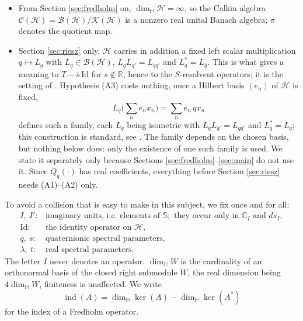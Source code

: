 \documentclass[12pt,a4paper]{article}
\theoremstyle{plain}
\theoremstyle{definition}
\theoremstyle{remark}
\newcommand{\HH}{\mathbb H}
\newcommand{\RR}{\mathbb R}
\newcommand{\CC}{\mathbb C}
\newcommand{\BB}{\mathcal B}
\newcommand{\KK}{\mathcal K}
\newcommand{\Calk}{\mathcal C}
\newcommand{\Id}{\mathrm{Id}}
\newcommand{\HS}{\mathcal H}
\newcommand{\sphere}{\mathbb S}
\newcommand{\dimH}{\dim_{\HH}}
\DeclareMathOperator{\ind}{ind}
\begin{document}
{\begin{itemize}[leftmargin=3em]
\item[(A2)] From Section \ref{sec:fredholm} on, $\dimH\HS=\infty$, so
the Calkin algebra $\Calk(\HS)=\BB(\HS)/\KK(\HS)$ is a nonzero real
unital Banach algebra; $\pi$ denotes the quotient map.

\item[(A3)] Section \ref{sec:riesz} only, $\HS$ carries in
addition a fixed left scalar multiplication $q\mapsto L_q$ with
$L_q\in\BB(\HS)$, $L_qL_{q'}=L_{qq'}$ and $L_q^*=L_{\overline q}$.
This is what gives a meaning to $T-\overline s\,\Id$ for $s\notin\RR$,
hence to the $S$-resolvent operators; it is the setting of
\cite{ColomboGantnerKimsey2018,BaloudiBelgacemJeribi2022}. Hypothesis
(A3) costs nothing, once a Hilbert basis $(e_n)$ of $\HS$ is fixed,
\[
 L_q\Big(\sum_n e_nx_n\Big)=\sum_n e_n\,qx_n
\]
defines such a family, each $L_q$ being isometric with
$L_qL_{q'}=L_{qq'}$ and $L_q^*=L_{\overline q}$; this construction is
standard, see \cite[Section 3]{GhiloniMorettiPerotti2013}. The family
depends on the chosen basis, but nothing below does: only the
existence of one such family is used. We state it separately
only because Sections \ref{sec:fredholm}--\ref{sec:main} do not use
it. Since $Q_q(\cdot)$ has real coefficients, everything before
Section \ref{sec:riesz} needs (A1)--(A2) only.
\end{itemize}

To avoid a collision that is easy to make in this
subject, we fix once and for all:
\[
 \begin{array}{ll}
 I,\ I':&\text{imaginary units, i.e.\ elements of }\sphere;
 \text{ they occur only in }\CC_I\text{ and }ds_I,\\[2pt]
 \Id:&\text{the identity operator on }\HS,\\[2pt]
 q,\ s:&\text{quaternionic spectral parameters},\\[2pt]
 \lambda,\ t:&\text{real spectral parameters}.
 \end{array}
\]
The letter $I$ never denotes an operator. $\dimH W$ is the
cardinality of an orthonormal basis of the closed right submodule $W$,
the real dimension being $4\dimH W$, finiteness is unaffected. We write
$$\ind(A)=\dimH\ker(A)-\dimH\ker(A^*)$$ for the index of a Fredholm
operator.

}
\end{document}
